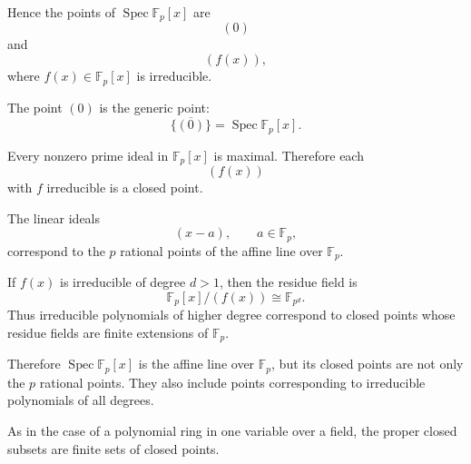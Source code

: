 	Hence the points of \(\operatorname{Spec}\mathbb F_p[x]\) are
	\[
	(0)
	\]
	and
	\[
	(f(x)),
	\]
	where \(f(x)\in\mathbb F_p[x]\) is irreducible.
	
	The point \((0)\) is the generic point:
	\[
	\overline{\{(0)\}}=\operatorname{Spec}\mathbb F_p[x].
	\]
	
	Every nonzero prime ideal in \(\mathbb F_p[x]\) is maximal. Therefore each
	\[
	(f(x))
	\]
	with \(f\) irreducible is a closed point.
	
	The linear ideals
	\[
	(x-a),
	\qquad a\in \mathbb F_p,
	\]
	correspond to the \(p\) rational points of the affine line over \(\mathbb F_p\).
	
	If \(f(x)\) is irreducible of degree \(d>1\), then the residue field is
	\[
	\mathbb F_p[x]/(f(x))\cong \mathbb F_{p^d}.
	\]
	Thus irreducible polynomials of higher degree correspond to closed points whose
	residue fields are finite extensions of \(\mathbb F_p\).
	
	Therefore \(\operatorname{Spec}\mathbb F_p[x]\) is the affine line over \(\mathbb F_p\), but
	its closed points are not only the \(p\) rational points. They also include
	points corresponding to irreducible polynomials of all degrees.
	
	As in the case of a polynomial ring in one variable over a field, the proper
	closed subsets are finite sets of closed points.
